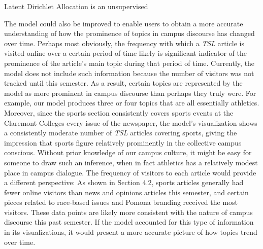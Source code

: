 \documentclass[a4paper]{article}
\begin{document}
Latent Dirichlet Allocation is an unsupervised 

The model could also be improved to enable users to obtain a more accurate understanding of how the prominence of topics in campus discourse has changed over time. Perhaps most obviously, the frequency with which a \textit{TSL} article is visited online over a certain period of time likely is significant indicator of the prominence of the article's main topic during that period of time. Currently, the model does not include such information because the number of visitors was not tracked until this semester. As a result, certain topics are represented by the model as more prominent in campus discourse than perhaps they truly were. For example, our model produces three or four topics that are all essentially athletics. Moreover, since the sports section consistently covers sports events at the Claremont Colleges every issue of the newspaper, the model's visualization shows a consistently moderate number of \textit{TSL} articles covering sports, giving the impression that sports figure relatively prominently in the collective campus conscious. Without prior knowledge of our campus culture, it might be easy for someone to draw such an inference, when in fact athletics has a relatively modest place in campus dialogue. The frequency of visitors to each article would provide a different perspective: As shown in Section 4.2, sports articles generally had fewer online visitors than news and opinions articles this semester, and certain pieces related to race-based issues and Pomona branding received the most visitors. These data points are likely more consistent with the nature of campus discourse this past semester. If the model accounted for this type of information in its visualizations, it would present a more accurate picture of how topics trend over time.
\end{document}
